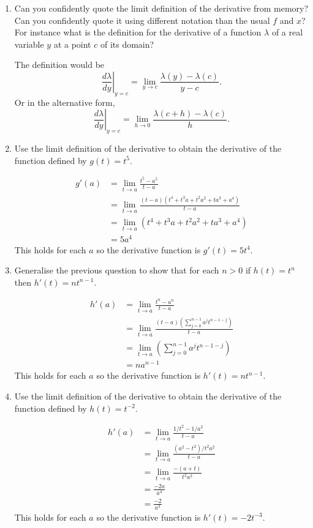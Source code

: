 \documentclass[10pt]{memoir}
\newcounter{pass}
\begin{document}
\begin{enumerate}
\setcounter{enumi}{\value{pass}}
\item
Can you confidently quote the limit definition of the derivative from memory? Can you confidently quote it using different notation than the usual $f$ and $x$? For instance what is the definition for the derivative of a function $\lambda$ of a real variable $y$ at a point $c$ of its domain?
\begin{solution}
The definition would be
$$\left. \frac{d \lambda}{dy} \right |_{y=c} = \lim_{y \to c} \frac{\lambda(y) - \lambda(c)}{y-c}.$$
Or in the alternative form,
$$\left. \frac{d \lambda}{dy} \right |_{y=c} = \lim_{h \to 0} \frac{\lambda(c+h) - \lambda(c)}{h}.$$
\end{solution}
\item
Use the limit definition of the derivative to obtain the derivative of the function defined by $g(t) = t^5$.
\begin{solution}
\begin{align*}
g'(a) &= \lim_{t \to a} \frac{t^5 - a^5}{t-a}\\
&=\lim_{t \to a} \frac{(t-a)(t^4 + t^3a + t^2a^2 + ta^3 + a^4)}{t-a}\\
&=\lim_{t \to a} (t^4 + t^3a + t^2a^2 + ta^3 + a^4)\\
&= 5a^4
\end{align*}
This holds for each $a$ so the derivative function is $g'(t)=5t^4$.
\end{solution}
\item
Generalise the previous question to show that for each $n>0$ if $h(t) = t^{n}$ then $h'(t) = n t^{n-1}$.
\begin{solution}
\begin{align*}
h'(a) &= \lim_{t \to a} \frac{t^n- a^n}{t-a}\\
&=\lim_{t \to a} \frac{(t-a)\left (\sum_{j=0}^{n-1} a^jt^{n-1-j} \right )}{t-a}\\
&=\lim_{t \to a} \left (\sum_{j=0}^{n-1} a^jt^{n-1-j} \right )\\
&= na^{n-1}
\end{align*}
This holds for each $a$ so the derivative function is $h'(t)=nt^{n-1}$.
\end{solution}
\item
Use the limit definition of the derivative to obtain the derivative of the function defined by $h(t) = t^{-2}$.
\begin{solution}
\begin{align*}
h'(a) &= \lim_{t \to a} \frac{1/t^2 - 1/a^2}{t-a}\\
&=\lim_{t \to a} \frac{(a^2-t^2)/t^2a^2}{t-a}\\
&=\lim_{t \to a} \frac{-(a+t)}{t^2a^2}\\
&= \frac{-2a}{a^4}\\
&=\frac{-2}{a^3}
\end{align*}
This holds for each $a$ so the derivative function is $h'(t)=-2t^{-3}$.
\end{solution}


\end{enumerate}
\end{document}
